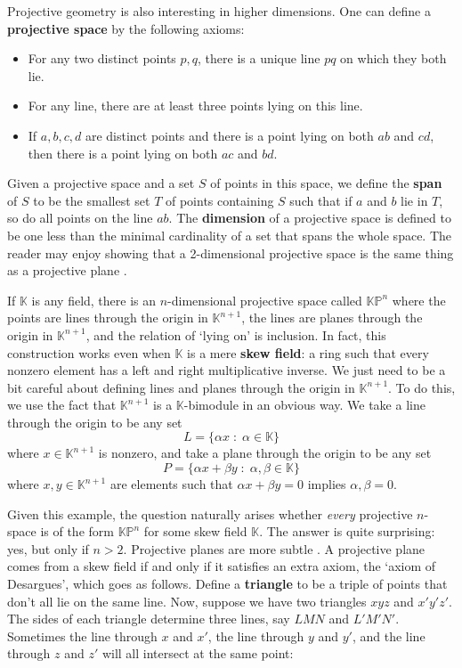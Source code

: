 \documentclass[12pt]{article}
\newcommand\K{{\mathbb K}}
\newcommand\KP{{\mathbb {KP}}}
\begin{document}
Projective geometry is also interesting in higher dimensions. 
One can define a {\bf projective space} by the following axioms: 
\begin{itemize} 
\item For any two distinct points $p,q$, there is a unique line 
$pq$ on which they both lie. 
\item For any line, there are at least three points lying on this line. 
\item If $a,b,c,d$ are distinct points and there is a point lying 
on both $ab$ and $cd$, then there is a point lying on both $ac$ and $bd$. 
\end{itemize} 
Given a projective space and a set $S$ of points in this space, we 
define the {\bf span} of $S$ to be the smallest set $T$ of points
containing $S$ such that if $a$ and $b$ lie in $T$, so do all points
on the line $ab$.  The {\bf dimension}  
of a projective space is defined to be one less than the minimal 
cardinality of a set that spans the whole space.  The reader may enjoy 
showing that a 2-dimensional projective space is the same thing as a 
projective plane \cite{Garner}. 
 
If $\K$ is any field, there is an $n$-dimensional projective space  
called $\KP^n$ where the points are lines through the origin in 
$\K^{n+1}$, the lines are planes through the origin in $\K^{n+1}$, and 
the relation of `lying on' is inclusion.  In fact, this construction 
works even when $\K$ is a mere {\bf skew field}: a ring such that every 
nonzero element has a left and right multiplicative inverse.   We just 
need to be a bit careful about defining lines and planes through the 
origin in $\K^{n+1}$.  To do this, we use the fact that $\K^{n+1}$ is a 
$\K$-bimodule in an obvious way.  We take a line through the origin to 
be any set  
\[   L = \{ \alpha x \; \colon\; \alpha \in \K \}  \] 
where $x \in \K^{n+1}$ is nonzero, and take a plane through the 
origin to be any set 
\[   P = \{ \alpha x + \beta y \; \colon \; \alpha,\beta \in \K \} \] 
where $x,y \in \K^{n+1}$ are elements such that  
$\alpha x + \beta y = 0$ implies $\alpha,\beta = 0$.  
 
Given this example, the question naturally arises whether {\it every} 
projective $n$-space is of the form $\KP^n$ for some skew field $\K$. 
The answer is quite surprising: yes, but only if $n > 2$.  Projective 
planes are more subtle \cite{Stevenson}.  A projective plane comes 
from a skew field if and only if it satisfies an extra axiom, the 
`axiom of Desargues', which goes as follows.  Define a {\bf triangle}  
to be a triple of points that don't all lie on the same line.  Now,  
suppose we have two triangles $xyz$ and $x'y'z'$.  The sides of each  
triangle determine three lines, say $LMN$ and $L'M'N'$.  Sometimes  
the line through $x$ and $x'$, the line through $y$ and $y'$, and  
the line through $z$ and $z'$ will all intersect at the same point: 
\end{document}
